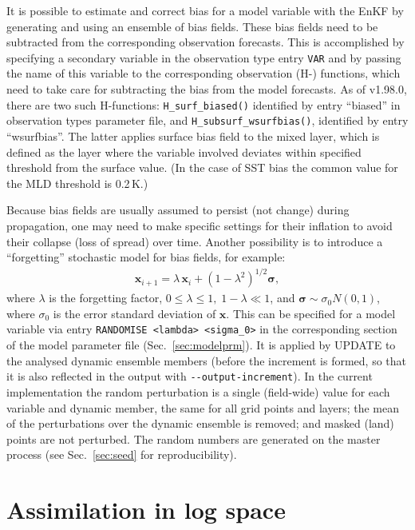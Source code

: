 \documentclass[11pt]{report}
\newcommand{\mb} {\mathbf}
\newcommand{\ms} {\boldsymbol}
\begin{document}
It is possible to estimate and correct bias for a model variable with the EnKF by generating and using an ensemble of bias fields.
These bias fields need to be subtracted from the corresponding observation forecasts.
This is accomplished by specifying a secondary variable in the observation type entry \verb|VAR| and by passing the name of this variable to the corresponding observation (H-) functions, which need to take care for subtracting the bias from the model forecasts.
As of v1.98.0, there are two such H-functions: \verb|H_surf_biased()| identified by entry ``biased'' in observation types parameter file, and \verb|H_subsurf_wsurfbias()|, identified by entry ``wsurfbias''.
The latter applies surface bias field to the mixed layer, which is defined as the layer where the variable involved deviates within specified threshold from the surface value.
(In the case of SST bias the common value for the MLD threshold is 0.2\,K.)

Because bias fields are usually assumed to persist (not change) during propagation, one may need to make specific settings for their inflation to avoid their collapse (loss of spread) over time.
Another possibility is to introduce a ``forgetting'' stochastic model for bias fields, for example:
\begin{align*}
  \mb x_{i+1} = \lambda \, \mb x_i + (1 - \lambda^2)^{1/2} \ms \sigma,
\end{align*}
where $\lambda$ is the forgetting factor, $0 \le \lambda \le 1, \; 1 - \lambda \ll 1$, and $\ms \sigma \sim \sigma_0 N(0, 1)$, where $\sigma_0$ is the error standard deviation of $\mb x$.
This can be specified for a model variable via entry \verb|RANDOMISE <lambda> <sigma_0>| in the corresponding section of the model parameter file (Sec.~\ref{sec:modelprm}).
It is applied by UPDATE to the analysed dynamic ensemble members (before the increment is formed, so that it is also reflected in the output with \verb|--output-increment|).
In the current implementation the random perturbation is a single (field-wide) value for each variable and dynamic member, the same for all grid points and layers; the mean of the perturbations over the dynamic ensemble is removed; and masked (land) points are not perturbed.
The random numbers are generated on the master process (see Sec.~\ref{sec:seed} for reproducibility).

\section{Assimilation in log space}
\label{sec:logspace}
\end{document}
